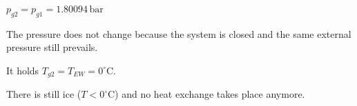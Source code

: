 \( p_{g2} = p_{g1} = 1.80094 \, \text{bar} \)  

The pressure does not change because the system is closed and the same external pressure still prevails.  

It holds \( T_{g2} = T_{EW} = 0^\circ \text{C} \).  

There is still ice (\( T < 0^\circ \text{C} \)) and no heat exchange takes place anymore.